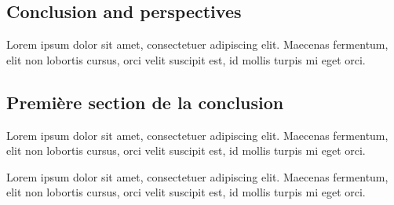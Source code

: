 \begin{bibunit}

\chapter*{Conclusion and perspectives}

Lorem ipsum dolor sit amet, consectetuer adipiscing elit. Maecenas fermentum, elit non lobortis cursus, orci velit suscipit est, id mollis turpis mi eget orci.

\section*{Première section de la conclusion}

Lorem ipsum dolor sit amet, consectetuer adipiscing elit. Maecenas fermentum, elit non lobortis cursus, orci velit suscipit est, id mollis turpis mi eget orci.

Lorem ipsum dolor sit amet, consectetuer adipiscing elit. Maecenas fermentum, elit non lobortis cursus, orci velit suscipit est, id mollis turpis mi eget orci.

\end{bibunit}